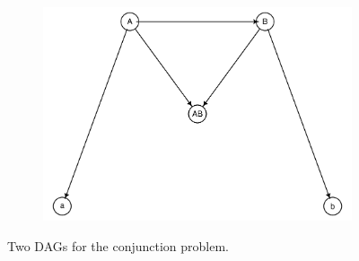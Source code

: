 \documentclass[
  10pt,
  dvipsnames,enabledeprecatedfontcommands]{scrartcl}
\begin{document}
\begin{figure}[H]
\hspace{2mm} 
\hspace{5mm}\begin{subfigure}[!ht]{0.45\textwidth}
\vspace{1mm}

\begin{center}\includegraphics[width=1\linewidth]{conjunction-appendix9_files/figure-latex/unnamed-chunk-3-1} \end{center}
\end{subfigure}
\normalsize
\caption{Two DAGs for the conjunction problem.}
\label{fig:conjunctionBNs}
\end{figure}
\end{document}
